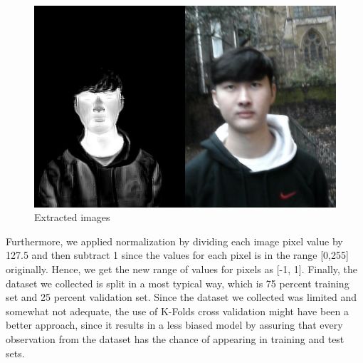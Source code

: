 \documentclass[conference]{IEEEtran}
\begin{document}
\begin{figure}[htbp]
\centerline{\includegraphics[scale=0.25]{92.jpg}}
\caption{Extracted images}
\label{fig}
\end{figure}

Furthermore, we applied normalization by dividing each image pixel value by 127.5 and then subtract 1 since the values for each pixel is in the range [0,255] originally. Hence, we get the new range of values for pixels as [-1, 1]. Finally, the dataset we collected is split in a most typical way, which is 75 percent training set and 25 percent validation set. Since the dataset we collected was limited and somewhat not adequate, the use of K-Folds cross validation might have been a better approach, since it results in a less biased model by assuring that every observation from the dataset has the chance of appearing in training and test sets.
\\
\end{document}
